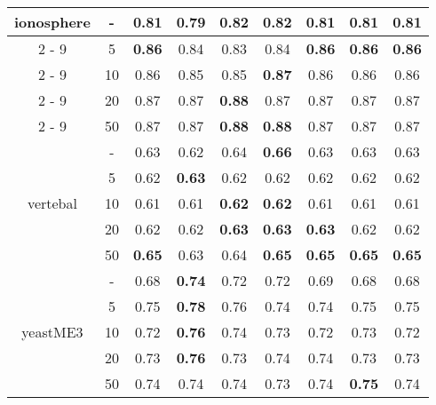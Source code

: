 \documentclass{article}%
\begin{document}
\begin{tabular}{c|c|ccccccc}
\hline%
\multirow{5}{*}{ionosphere}&{-}&0.81&0.79&\textbf{0.82}&\textbf{0.82}&0.81&0.81&0.81\\%
\cline{2%
-%
9}%
&5&\textbf{0.86}&0.84&0.83&0.84&\textbf{0.86}&\textbf{0.86}&\textbf{0.86}\\%
\cline{2%
-%
9}%
&10&0.86&0.85&0.85&\textbf{0.87}&0.86&0.86&0.86\\%
\cline{2%
-%
9}%
&20&0.87&0.87&\textbf{0.88}&0.87&0.87&0.87&0.87\\%
\cline{2%
-%
9}%
&50&0.87&0.87&\textbf{0.88}&\textbf{0.88}&0.87&0.87&0.87\\%
\hline%
\multirow{5}{*}{vertebal}&{-}&0.63&0.62&0.64&\textbf{0.66}&0.63&0.63&0.63\\%
\cline{2%
-%
9}%
&5&0.62&\textbf{0.63}&0.62&0.62&0.62&0.62&0.62\\%
\cline{2%
-%
9}%
&10&0.61&0.61&\textbf{0.62}&\textbf{0.62}&0.61&0.61&0.61\\%
\cline{2%
-%
9}%
&20&0.62&0.62&\textbf{0.63}&\textbf{0.63}&\textbf{0.63}&0.62&0.62\\%
\cline{2%
-%
9}%
&50&\textbf{0.65}&0.63&0.64&\textbf{0.65}&\textbf{0.65}&\textbf{0.65}&\textbf{0.65}\\%
\hline%
\multirow{5}{*}{yeastME3}&{-}&0.68&\textbf{0.74}&0.72&0.72&0.69&0.68&0.68\\%
\cline{2%
-%
9}%
&5&0.75&\textbf{0.78}&0.76&0.74&0.74&0.75&0.75\\%
\cline{2%
-%
9}%
&10&0.72&\textbf{0.76}&0.74&0.73&0.72&0.73&0.72\\%
\cline{2%
-%
9}%
&20&0.73&\textbf{0.76}&0.73&0.74&0.74&0.73&0.73\\%
\cline{2%
-%
9}%
&50&0.74&0.74&0.74&0.73&0.74&\textbf{0.75}&0.74\\%
\hline%
\end{tabular}

%
\end{document}
